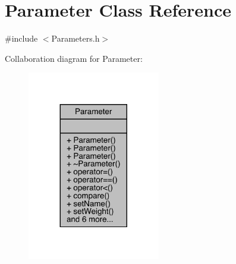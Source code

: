 \hypertarget{class_parameter}{}\section{Parameter Class Reference}
\label{class_parameter}


{\ttfamily \#include $<$Parameters.\+h$>$}



Collaboration diagram for Parameter\+:\nopagebreak
\begin{figure}[H]
\begin{center}
\leavevmode
\includegraphics[width=164pt]{class_parameter__coll__graph}
\end{center}
\end{figure}
